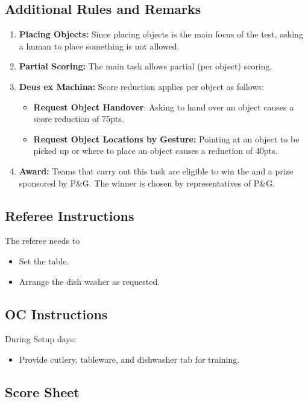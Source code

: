 \subsection*{Additional Rules and Remarks}
\begin{enumerate}[nosep]
	\item \textbf{Placing Objects:} Since placing objects is the main focus of the test, asking a human to place something is not allowed.
	
	\item \textbf{Partial Scoring:} The main task allows partial (per object) scoring.
	
	\item \textbf{Deus ex Machina:} Score reduction applies per object as follows:
	\begin{itemize}[nosep]
		\item \textbf{Request Object Handover}: Asking to hand over an object causes a score reduction of 75pts.
		\item \textbf{Request Object Locations by Gesture:} Pointing at an object to be picked up or where to place an object causes a reduction of 40pts.

	\end{itemize}

	\item \textbf{Award:} Teams that carry out this task are eligible to win the \PGAward{} and a prize sponsored by P\&G. The winner is chosen by representatives of P\&G.

\end{enumerate}

\newpage

\subsection*{Referee Instructions}

The referee needs to
\begin{itemize}
	\item Set the table.
	\item Arrange the dish washer as requested.
\end{itemize}

\subsection*{OC Instructions}
During Setup days:
\begin{itemize}
	\item Provide cutlery, tableware, and dishwasher tab for training.
\end{itemize}

\subsection*{Score Sheet}



